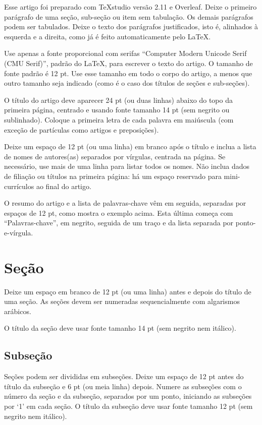 \documentclass[
	article,			%
	12pt,				%
	oneside,			%
	a4paper,			%
	english,			%
	brazil,				%
	sumario=tradicional
	]{abntex2}
\begin{document}
  Esse artigo foi preparado com TeXstudio versão 2.11 e Overleaf. Deixe o primeiro parágrafo de uma seção, sub-seção ou item sem tabulação. Os demais parágrafos podem ser tabulados.  Deixe o texto dos parágrafos justificados, isto é, alinhados à esquerda e a direita, como já é feito automaticamente pelo LaTeX.
    
	Use apenas a fonte proporcional com serifas “Computer Modern Unicode Serif (CMU Serif)”, padrão do LaTeX, para escrever o texto do artigo.  O tamanho de fonte padrão é 12 pt.  Use esse tamanho em todo o corpo do artigo, a menos que outro tamanho seja indicado (como é o caso dos títulos de seções e sub-seções).
    
	O título do artigo deve aparecer 24 pt (ou duas linhas) abaixo do topo da primeira página, centrado e usando fonte tamanho 14 pt (sem negrito ou sublinhado).  Coloque a primeira letra de cada palavra em maiúscula (com exceção de partículas como artigos e preposições).
    
	Deixe um espaço de 12 pt (ou uma linha) em branco após o título e inclua a lista de nomes de autores(as) separados por vírgulas, centrada na página.  Se necessário, use mais de uma linha para listar todos os nomes.  Não inclua dados de filiação ou títulos na primeira página: há um espaço reservado para mini-currículos ao final do artigo.
    
	O resumo do artigo e a lista de palavras-chave vêm em seguida, separadas por espaços de 12 pt, como mostra o exemplo acima.  Esta última começa com “Palavras-chave”, em negrito, seguida de um traço e da lista separada por ponto-e-vírgula.

\section{Seção}

Deixe um espaço em branco de 12 pt (ou uma linha) antes e depois do título de uma seção.  As seções devem ser numeradas sequencialmente com algarismos arábicos. 

O título da seção deve usar fonte tamanho 14 pt (sem negrito nem itálico).

\subsection{Subseção}

Seções podem ser divididas em subseções.  Deixe um espaço de 12 pt antes do título da subseção e 6 pt (ou meia linha) depois.  Numere as subseções com o número da seção e da subseção, separados por um ponto, iniciando as subseções por ‘1’ em cada seção.  O título da subseção deve usar fonte tamanho 12 pt (sem negrito nem itálico).
\end{document}
